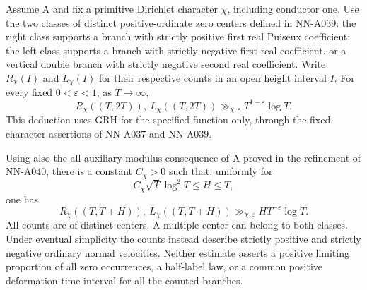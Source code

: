 \begin{theorem}
\label{thm:A041-cell-count}
Assume A and fix a primitive Dirichlet character $\chi$, including
conductor one. Use the two classes of distinct positive-ordinate
zero centers defined in NN-A039: the right class supports a branch
with strictly positive first real Puiseux coefficient; the left
class supports a branch with strictly negative first real coefficient,
or a vertical double branch with strictly negative second real
coefficient. Write $R_\chi(I)$ and $L_\chi(I)$ for their respective
counts in an open height interval $I$.
For every fixed $0<\varepsilon<1$, as $T\longrightarrow\infty$,
\begin{equation}\label{eq:A041-dyadic}
 R_\chi((T,2T)),\ L_\chi((T,2T))
             \gg_{\chi,\varepsilon}T^{1-\varepsilon}\log T.
\end{equation}
This deduction uses GRH for the specified function only, through
the fixed-character assertions of NN-A037 and NN-A039.

Using also the all-auxiliary-modulus consequence of A proved in
the refinement of NN-A040, there is a constant $C_\chi>0$ such
that, uniformly for
\[
 C_\chi\sqrt T\log^2T\le H\le T,
\]
one has
\begin{equation}\label{eq:A041-short}
 R_\chi((T,T+H)),\ L_\chi((T,T+H))
             \gg_{\chi,\varepsilon}H T^{-\varepsilon}\log T.
\end{equation}
All counts are of distinct centers. A multiple center can belong
to both classes. Under eventual simplicity the counts instead
describe strictly positive and strictly negative ordinary normal
velocities. Neither estimate asserts a positive limiting proportion
of all zero occurrences, a half-label law, or a common positive
deformation-time interval for all the counted branches.
\end{theorem}

